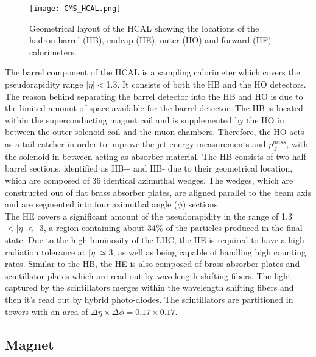 \begin{figure}[tb]
\begin{center}
\texttt{[image: CMS\_HCAL.png]} 
\caption{Geometrical layout of the HCAL showing the locations of the hadron barrel (HB), endcap (HE), outer (HO) and forward (HF) calorimeters\cite{CMShcal}.}
\label{CMS_HCAL_Layout} 
\end{center}
\end{figure}

The barrel component of the HCAL is a sampling calorimeter which covers the pseudorapidity range $|\eta|<$1.3. It consists of both the HB and the HO detectors. The reason behind separating the barrel detector into the HB and HO is due to the limited amount of space available for the barrel detector. The HB is located within the superconducting magnet coil and is supplemented by the HO in between the outer solenoid coil and the muon chambers. Therefore, the HO acts as a tail-catcher in order to improve the jet energy measurements and $p_\text{T}^{miss}$, with the solenoid in between acting as absorber material. The HB consists of two half-barrel sections, identified as HB+ and HB- due to their geometrical location, which are composed of 36 identical azimuthal wedges. The wedges, which are constructed out of flat brass absorber plates, are aligned parallel to the beam axis and are segmented into four azimuthal angle ($\phi$) sections.\\ 

The HE covers a significant amount of the pseudorapidity in the range of 1.3 $< |\eta| <$ 3, a region containing about 34\% of the particles produced in the final state. Due to the high luminosity of the LHC, the HE is required to have a high radiation tolerance at $|\eta| \simeq 3$, as well as being capable of handling high counting rates. Similar to the HB, the HE is also composed of brass absorber plates and scintillator plates which are read out by wavelength shifting fibers. The light captured by the scintillators merges within the wavelength shifting fibers and then it's read out by hybrid photo-diodes. The scintillators are partitioned in towers with an area of $\Delta\eta\times\Delta\phi = 0.17\times0.17$.\\

\subsection{Magnet}

